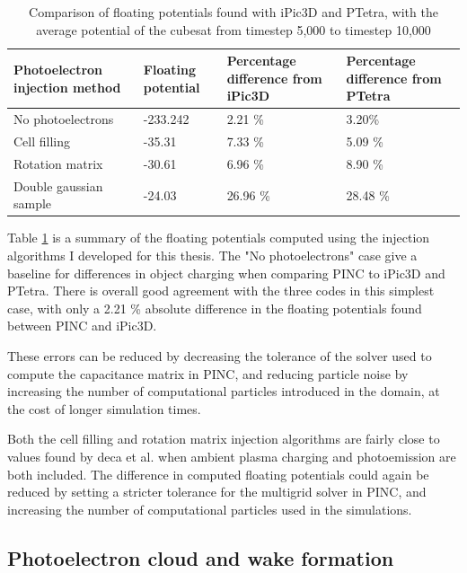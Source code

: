 \begin{table}[H]
\begin{tabular}{p{4cm}|p{3cm}|p{3cm}|p{3cm}}
\toprule
\toprule
Photoelectron injection method & Floating potential & Percentage difference from iPic3D & Percentage difference from PTetra \\
\midrule
No photoelectrons & -233.242 & 2.21 \% & 3.20\% \\[1mm]
Cell filling & -35.31 & 7.33 \% & 5.09 \% \\[1mm]
Rotation matrix  & -30.61 & 6.96 \% & 8.90 \% \\[1mm]
Double gaussian sample & -24.03 & 26.96 \% & 28.48 \% \\[1mm]
\bottomrule
\bottomrule
\end{tabular}
\caption{Comparison of floating potentials found with iPic3D and PTetra, with the average potential of the cubesat from timestep 5,000 to timestep 10,000}
\label{tab:floatingPsummary}
\end{table}

\vspace{2cm}
Table \ref{tab:floatingPsummary} is a summary of the floating potentials computed using the injection algorithms I developed for this thesis. The "No photoelectrons" case give a baseline for differences in object charging when comparing PINC to iPic3D and PTetra. There is overall good agreement with the three codes in this simplest case, with only a 2.21 \% absolute difference in the floating potentials found between PINC and iPic3D.

These errors can be reduced by decreasing the tolerance of the solver used to compute the capacitance matrix in PINC, and reducing particle noise by increasing the number of computational particles introduced in the domain, at the cost of longer simulation times. 

Both the cell filling and rotation matrix injection algorithms are fairly close to values found by deca et al. when ambient plasma charging and photoemission are both included. The difference in computed floating potentials could again be reduced by setting a stricter tolerance for the multigrid solver in PINC, and increasing the number of computational particles used in the simulations. 


\subsection{Photoelectron cloud and wake formation}

